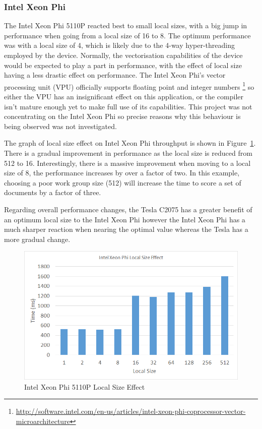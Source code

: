 \subsubsection{Intel Xeon Phi}

The Intel Xeon Phi 5110P reacted best to small local sizes, with a big jump in
performance when going from a local size of 16 to 8. The optimum performance was
with a local size of 4, which is likely due to the 4-way hyper-threading
employed by the device. Normally, the vectorisation capabilities of the device
would be expected to play a part in performance, with the effect of local size
having a less drastic effect on performance. The Intel Xeon Phi's vector
processing unit (VPU) officially supports floating point and integer numbers
\footnote{\url{http://software.intel.com/en-us/articles/intel-xeon-phi-coprocessor-vector-microarchitecture}}
so either the VPU has an insignificant effect on this application, or the
compiler isn't mature enough yet to make full use of its capabilities. This
project was not concentrating on the Intel Xeon Phi so precise reasons why this
behaviour is being observed was not investigated.

The graph of local size effect on Intel Xeon Phi throughput is shown in
Figure~\ref{fig:phiLocalSize}. There is a gradual improvement in performance as
the local size is reduced from 512 to 16. Interestingly, there is a massive
improvement when moving to a local size of 8, the performance increases by over
a factor of two. In this example, choosing a poor work group size (512) will
increase the time to score a set of documents by a factor of three.

Regarding overall performance changes, the Tesla C2075 has a greater benefit of
an optimum local size to the Intel Xeon Phi however the Intel Xeon Phi has a
much sharper reaction when nearing the optimal value whereas the Tesla has a
more gradual change.

\begin{figure}[H]
\includegraphics[width=\linewidth]{images/phiLocalSize.png}
\caption{Intel Xeon Phi 5110P Local Size Effect}
\label{fig:phiLocalSize}
\end{figure}

